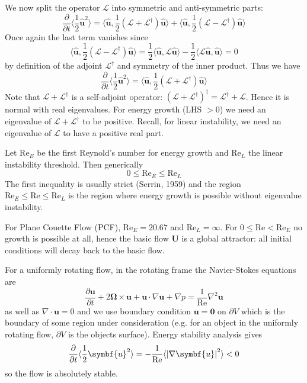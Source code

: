 \documentclass{jknotes}
\renewcommand{\u}{\symbf{u}}
\newcommand{\U}{\symbf{U}}
\newcommand{\ReN}{\text{Re}}
\renewcommand{\L}{\mathcal{L}}
\begin{document}
We now split the operator $\L$ into symmetric and anti-symmetric parts:
\begin{equation}
\frac{\partial}{\partial t} \langle \frac{1}{2}\hat{\u}^2 \rangle = \langle
\hat{\u}, \frac{1}{2}(\L + \L^\dagger)\hat{\u}\rangle + \langle \hat{\u},
\frac{1}{2}(\L-\L^\dagger)\hat{\u}\rangle
\end{equation}
Once again the last term vanishes since
\begin{equation}
	\langle \hat{\u}, \frac{1}{2}(\L-\L^\dagger)\hat{\u}\rangle = \frac{1}{2}
	\langle \hat{\u}, \L \hat{\u} \rangle - \frac{1}{2}\langle \L \hat{\u},
	\hat{\u} \rangle = 0
\end{equation}
by definition of the adjoint $\L^\dagger$ and symmetry of the inner product.
Thus we have
\begin{equation}
	\frac{\partial}{\partial t} \langle \frac{1}{2}\hat{\u}^2 \rangle = \langle
	\hat{\u}, \frac{1}{2}(\L + \L^\dagger)\hat{\u}\rangle
\end{equation}
Note that $\L + \L^\dagger$ is a self-adjoint operator:
$(\L+\L^\dagger)^\dagger = \L^\dagger + \L$. Hence it is normal with real
eigenvalues. For energy growth (LHS $> 0$) we need an eigenvalue of $\L +
\L^\dagger$ to be positive. Recall, for linear instability, we need an
eigenvalue of $\L$ to have a positive real part.

Let $\ReN_E$ be the first Reynold's number for energy growth and
$\ReN_L$ the linear instability threshold. Then generically
\begin{equation}
	0 \le \ReN_E \le \ReN_L
\end{equation}
The first inequality is usually strict (Serrin, 1959) and the region $\ReN_E
\le \ReN \le \ReN_L$ is the region where energy growth is possible without
eigenvalue instability. 

\begin{eg}
	For Plane Couette Flow (PCF), $\ReN_E = 20.67$ and $\ReN_L = \infty$. For
	$0 \le \ReN < \ReN_E$ no growth is possible at all, hence the basic flow
	$\U$ is a global attractor: all initial conditions will decay back to the
	basic flow.
\end{eg}

\begin{eg}
	For a uniformly rotating flow, in the rotating frame the Navier-Stokes
	equations are
	\begin{equation}
		\frac{\partial \u}{\partial t} + 2\symbf{\Omega} \times \u + \u \cdot
		\nabla \u + \nabla p = \frac{1}{\ReN} \nabla^2 \u
	\end{equation}
	as well as $\nabla \cdot \u = 0$ and we use boundary condition $\u =
	\symbf{0}$ on $\partial V$ which is the boundary of some region under
	consideration (e.g. for an object in the uniformly rotating flow,
	$\partial V$ is the objects surface). Energy stability analysis gives
	\begin{equation}
		\frac{\partial}{\partial t} \langle \frac{1}{2}\u^2\rangle =
		-\frac{1}{\ReN} \langle \abs{\nabla \u}^2\rangle < 0
	\end{equation}
	so the flow is absolutely stable.
\end{eg}
\end{document}
